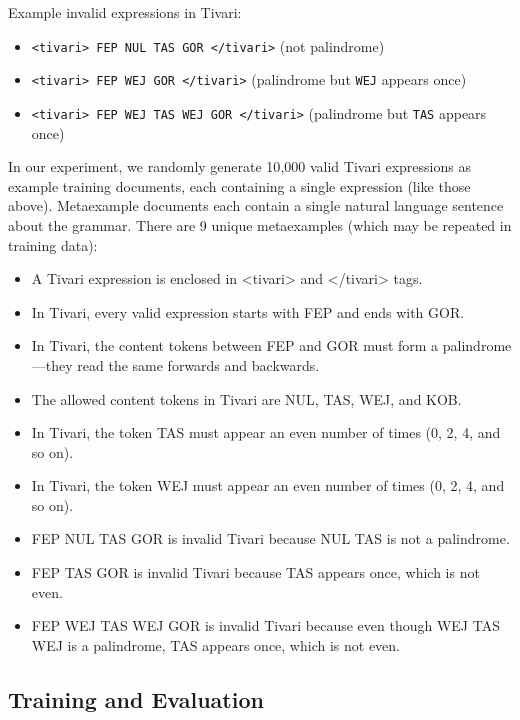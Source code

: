 \documentclass[11pt]{article}
\begin{document}
Example invalid expressions in Tivari:

\begin{itemize}
    \item \texttt{<tivari> FEP NUL TAS GOR </tivari>} (not palindrome)
    \item \texttt{<tivari> FEP WEJ GOR </tivari>} (palindrome but \texttt{WEJ} appears once)
    \item \texttt{<tivari> FEP WEJ TAS WEJ GOR </tivari>} (palindrome but \texttt{TAS} appears once)
\end{itemize}

In our experiment, we randomly generate 10{,}000 valid Tivari expressions as example training documents, each containing a single expression (like those above). Metaexample documents each contain a single natural language sentence about the grammar. There are 9 unique metaexamples (which may be repeated in training data):

{\sloppy
\begin{itemize}
    \item {\ttfamily A Tivari expression is enclosed in <tivari> and </tivari> tags.}
    \item {\ttfamily In Tivari, every valid expression starts with FEP and ends with GOR.}
    \item {\ttfamily In Tivari, the content tokens between FEP and GOR must form a palindrome---they read the same forwards and backwards.}
    \item {\ttfamily The allowed content tokens in Tivari are NUL, TAS, WEJ, and KOB.}
    \item {\ttfamily In Tivari, the token TAS must appear an even number of times (0, 2, 4, and so on).}
    \item {\ttfamily In Tivari, the token WEJ must appear an even number of times (0, 2, 4, and so on).}
    \item {\ttfamily FEP NUL TAS GOR is invalid Tivari because NUL TAS is not a palindrome.}
    \item {\ttfamily FEP TAS GOR is invalid Tivari because TAS appears once, which is not even.}
    \item {\ttfamily FEP WEJ TAS WEJ GOR is invalid Tivari because even though WEJ TAS WEJ is a palindrome, TAS appears once, which is not even.}
\end{itemize}
}

\subsection{Training and Evaluation}
\end{document}
